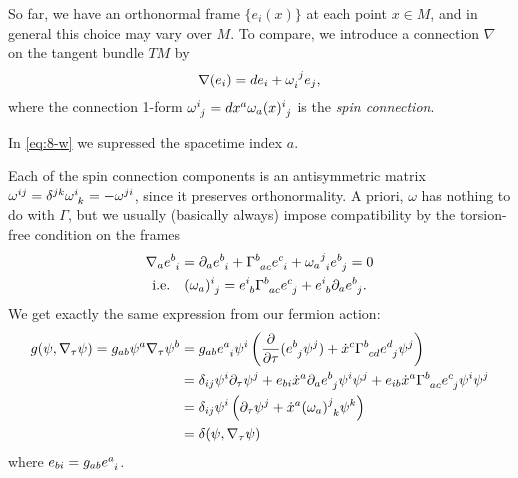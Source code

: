 So far, we have an orthonormal frame $\{e_i (x)\}$ at each point $x \in M$, and in general this choice may vary over $M$.
To compare, we introduce a connection $\nabla$ on the tangent bundle $T M$ by 
\begin{equation}
  \label{eq:8-w}
  \nabla (e_{i}) = d e_i + \omega\indices{_{i}^{j}} e_{j},
\end{equation}
where the connection 1-form $\omega\indices{^{i}_{j}} = dx^{a} \omega_{a}(x)\indices{^{i}_{j}}$ is the \emph{spin connection}.
\begin{remark}
  In \eqref{eq:8-w} we supressed the spacetime index $a$.
\end{remark}
Each of the spin connection components is an antisymmetric matrix $\omega^{ij} = \delta^{jk} \omega\indices{^{i}_{k}} = - \omega^{ji}$, since it preserves orthonormality.
A priori, $\omega$ has nothing to do with $\Gamma$, but we usually (basically always) impose compatibility by the torsion-free condition on the frames
\begin{gather}
  \nabla_a e\indices{^{b}_{i}} = \partial_{a} e\indices{^{b}_{i}} + \Gamma\indices{^{b}_{ac}} e\indices{^{c}_{i}} + \omega_{a}{}\indices{^{j}_{i}} e\indices{^{b}_{j}} = 0 \\
  \text{i.e.} \quad (\omega_a)\indices{^{i}_{j}} = e\indices{^{i}_{b}} \Gamma\indices{^{b}_{ac}} e\indices{^{c}_{j}} + e\indices{^{i}_{b}} \partial_{a} e\indices{^{b}_{j}} \label{eq:9-omega}.
\end{gather}
We get exactly the same expression from our fermion action:
\begin{align}
  g (\psi, \nabla_\tau \psi) = g_{ab} \psi^{a} \nabla_\tau \psi^{b} &= g_{ab} e\indices{^{a}_{i}} \psi^{i} \left( \frac{\partial }{\partial \tau} (e\indices{^{b}_{j}} \psi^{j}) + \dot{x}^{c} \Gamma\indices{^{b}_{cd}} e\indices{^{d}_{j}} \psi^{j} \right) \\
				       &= \delta_{ij} \psi^{i} \partial_{\tau} \psi^{j} + e_{bi} \dot{x}^{a} \partial_{a} e\indices{^{b}_{j}} \psi^{i} \psi^{j} + e_{ib} \dot{x}^{a} \Gamma\indices{^{b}_{ac}} e\indices{^{c}_{j}} \psi^{i} \psi^{j} \\
				       &= \delta_{ij} \psi^{i} \left( \partial_{\tau} \psi^{j} + \dot{x}^{a} (\omega_a)\indices{^{j}_{k}} \psi^{k} \right) \\
				       &= \delta(\psi, \nabla_\tau \psi)
\end{align}
where $e_{bi} = g_{ab} e\indices{^{a}_{i}}$.
